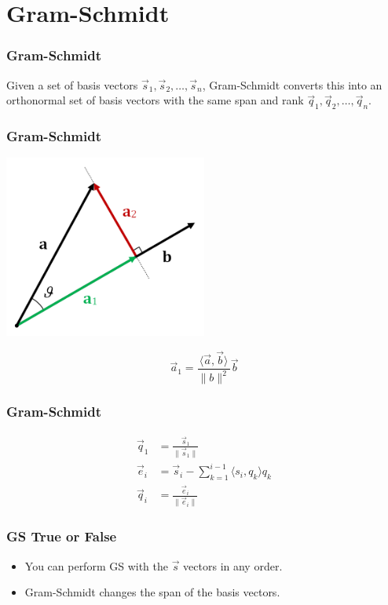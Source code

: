 \section{Gram-Schmidt}

\begin{frame}
    \frametitle{Gram-Schmidt}

    Given a set of basis vectors \(\vec{s}_1, \vec{s}_2, \ldots, \vec{s}_n\), Gram-Schmidt converts this into an orthonormal set of basis vectors with the same span and rank \(\vec{q}_1, \vec{q}_2, \ldots, \vec{q}_n\).
\end{frame}

\begin{frame}
    \frametitle{Gram-Schmidt}

    \begin{center}
        \includegraphics[width=0.5\textwidth]{images/projection.png}
    \end{center}

    \begin{equation}
        \vec{a}_1 = \frac{\langle \vec{a}, \vec{b} \rangle}{\|b\|^2} \vec{b}
    \end{equation}
\end{frame}

\begin{frame}
    \frametitle{Gram-Schmidt}

    \begin{align}
        \vec{q}_1 &= \frac{\vec{s}_1}{\|\vec{s}_1\|} \\
        \vec{e}_i &= \vec{s}_i - \sum_{k = 1}^{i - 1} \langle s_i, q_k \rangle q_k \\
        \vec{q}_i &= \frac{\vec{e}_i}{\|\vec{e}_i\|}
    \end{align}
\end{frame}

\begin{frame}
    \frametitle{GS True or False}

    \begin{itemize}
        \item You can perform GS with the \(\vec{s}\) vectors in any order. 
        \item Gram-Schmidt changes the span of the basis vectors. 
    \end{itemize}
\end{frame}
